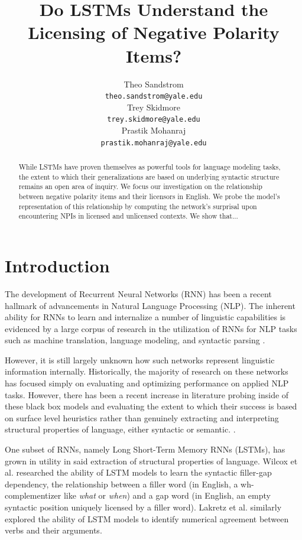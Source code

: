 \documentclass[11pt, round]{article}
\title{Do LSTMs Understand the Licensing of Negative Polarity Items?}
\author{Theo Sandstrom \\
  \texttt{theo.sandstrom@yale.edu} \\
  Trey Skidmore \\
  \texttt{trey.skidmore@yale.edu} \\
  Prastik Mohanraj \\
  \texttt{prastik.mohanraj@yale.edu}}
\begin{document}
\maketitle

\begin{abstract}
While LSTMs have proven themselves as powerful tools for language modeling tasks, the extent to which their generalizations are based on underlying syntactic structure remains an open area of inquiry. We focus our investigation on the relationship between negative polarity items and their licensors in English. We probe the model's representation of this relationship by computing the network's surprisal upon encountering NPIs in licensed and unlicensed contexts. We show that...
\end{abstract}

\section{Introduction}

The development of Recurrent Neural Networks (RNN) has been a recent hallmark of advancements in Natural Language Processing (NLP). The inherent ability for RNNs to learn and internalize a number of linguistic capabilities is evidenced by a large corpus of research in the utilization of RNNs for NLP tasks such as machine translation, language modeling, and syntactic parsing \cite{wilcox-etal-2018-rnn,gulordava2018colorless,jozefowicz2016exploring}. 

However, it is still largely unknown how such networks represent linguistic information internally. Historically, the majority of research on these networks has focused simply on evaluating and optimizing performance on applied NLP tasks. However, there has been a recent increase in literature probing inside of these black box models and evaluating the extent to which their success is based on surface level heuristics rather than genuinely extracting and interpreting structural properties of language, either syntactic or semantic. \cite{lakretz2019emergence}.

One subset of RNNs, namely Long Short-Term Memory RNNs (LSTMs), has grown in utility in said extraction of structural properties of language. Wilcox et al.  researched the ability of LSTM models to learn the syntactic filler-gap dependency, the relationship between a filler word (in English, a wh- complementizer like \textit{what} or \textit{when}) and a gap word (in English, an empty syntactic position uniquely licensed by a filler word). Lakretz et al.  similarly explored the ability of LSTM models to identify numerical agreement between verbs and their arguments. 
\end{document}

